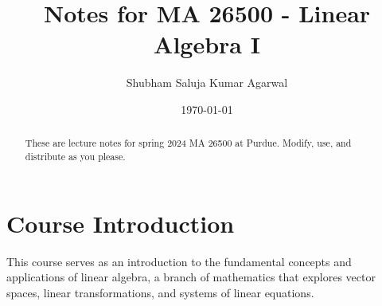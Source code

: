 \documentclass[nobib]{tufte-handout}
\title{Notes for MA 26500 - Linear Algebra I}
\author[Shubham Saluja Kumar Agarwal]{Shubham Saluja Kumar Agarwal}
\date{\today}  %
\begin{document}
\maketitle

\begin{abstract}
    These are lecture notes for spring 2024 MA 26500 at Purdue. Modify, use, and distribute as you please.
\end{abstract}

\tableofcontents

\section{Course Introduction}
This course serves as an introduction to the fundamental concepts and
applications of linear algebra, a branch of mathematics that explores vector
spaces, linear transformations, and systems of linear equations.

\pagebreak
\end{document}
